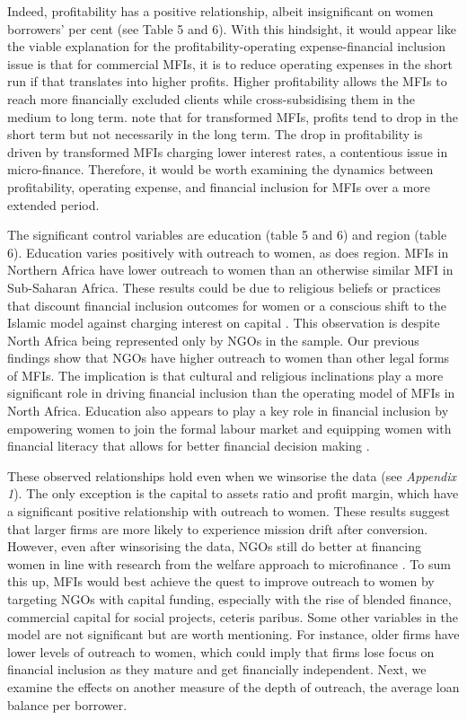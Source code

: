 \documentclass[a4paper,nobind]{templates/ociamthesis}
\begin{document}
Indeed, profitability has a positive relationship, albeit insignificant on women borrowers' per cent (see Table 5 and 6). With this hindsight, it would appear like the viable explanation for the profitability-operating expense-financial inclusion issue is that for commercial MFIs, it is to reduce operating expenses in the short run if that translates into higher profits. Higher profitability allows the MFIs to reach more financially excluded clients while cross-subsidising them in the medium to long term. \textcite{d2017ngos} note that for transformed MFIs, profits tend to drop in the short term but not necessarily in the long term. The drop in profitability is driven by transformed MFIs charging lower interest rates, a contentious issue in micro-finance. Therefore, it would be worth examining the dynamics between profitability, operating expense, and financial inclusion for MFIs over a more extended period.

The significant control variables are education (table 5 and 6) and region (table 6). Education varies positively with outreach to women, as does region. MFIs in Northern Africa have lower outreach to women than an otherwise similar MFI in Sub-Saharan Africa. These results could be due to religious beliefs or practices that discount financial inclusion outcomes for women or a conscious shift to the Islamic model against charging interest on capital \autocite{hassan2018religious}. This observation is despite North Africa being represented only by NGOs in the sample. Our previous findings show that NGOs have higher outreach to women than other legal forms of MFIs. The implication is that cultural and religious inclinations play a more significant role in driving financial inclusion than the operating model of MFIs in North Africa. Education also appears to play a key role in financial inclusion by empowering women to join the formal labour market and equipping women with financial literacy that allows for better financial decision making \autocite{zins2016determinants,chikalipah2017determines}.

These observed relationships hold even when we winsorise the data (see \emph{Appendix 1}). The only exception is the capital to assets ratio and profit margin, which have a significant positive relationship with outreach to women. These results suggest that larger firms are more likely to experience mission drift after conversion. However, even after winsorising the data, NGOs still do better at financing women in line with research from the welfare approach to microfinance \autocite{kodongo2013individual}. To sum this up, MFIs would best achieve the quest to improve outreach to women by targeting NGOs with capital funding, especially with the rise of blended finance, commercial capital for social projects, ceteris paribus. Some other variables in the model are not significant but are worth mentioning. For instance, older firms have lower levels of outreach to women, which could imply that firms lose focus on financial inclusion as they mature and get financially independent. Next, we examine the effects on another measure of the depth of outreach, the average loan balance per borrower.
\end{document}
